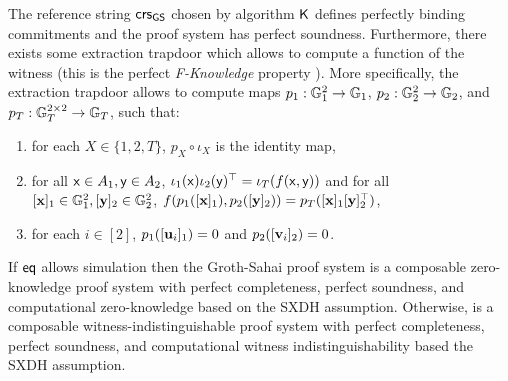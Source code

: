 The reference string $\mathsf{crs}_{\mathsf{GS}}$ chosen by algorithm $\mathsf{K}$ defines perfectly binding commitments and the proof system has perfect soundness. Furthermore, there exists some extraction trapdoor which allows to compute a function of the witness (this is the perfect \emph{F-Knowledge} property \cite{PKC:EscGro14}). More specifically, the extraction trapdoor
allows to compute maps $p_1: \mathbb{G}_1^2\to \mathbb{G}_1$, $p_2:\mathbb{G}_2^2 \to \mathbb{G}_2$, and $p_T:\mathbb{G}_T^{2 \times 2} \to  \mathbb{G}_T$, such that:
\begin{enumerate}[label=(\alph*)]
\item for each $X\in\{1,2,T\}$, $p_X\circ\iota_X$ is the identity map,
\item for all $\mathsf{x}\in A_1,\mathsf{y}\in A_2$, $\iota_1(\mathsf{x})\iota_2(\mathsf{y})^\top = \iota_T(f(\mathsf{x},\mathsf{y}))$ and for all $[\mathbf{x}]_1\in\mathbb{G}_1^2,[\mathbf{y}]_2\in\mathbb{G}_2^2$,
$f(p_1([\mathbf{x}]_1),p_2([\mathbf{y}]_2))=p_T([\mathbf{x}]_1[\mathbf{y}]_2^\top)$,
\item for each $i\in[2]$, $p_1([\mathbf{u}_i]_1)=0$ and $p_2([\mathbf{v}_i]_2)=0$.
\end{enumerate}

\begin{theorem} If $\mathsf{eq}$ allows simulation then the Groth-Sahai proof system is a composable zero-knowledge proof system with perfect completeness, perfect soundness, and computational zero-knowledge based on the SXDH assumption. Otherwise, is a composable witness-indistinguishable proof system with perfect completeness, perfect soundness, and computational witness indistinguishability based the SXDH assumption.
\end{theorem}

